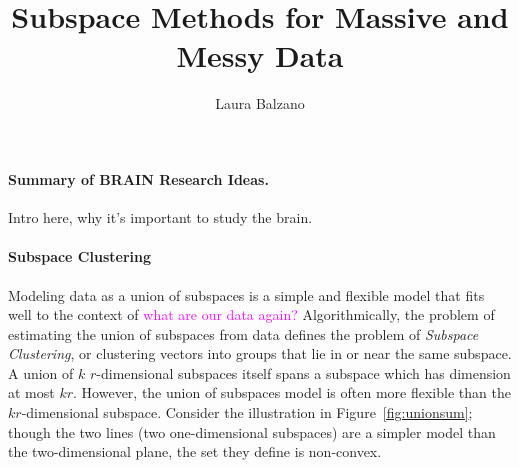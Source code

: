 \documentclass[times,11pt]{article} %
\newcommand{\laura}{\textcolor{magenta}}
\begin{document}
%
\title{Subspace Methods for Massive and Messy Data}

\author{Laura Balzano}
\def \E{\mathbb E}
\def \Expect{\mathbb E}
\def \1{\mathbf 1}
\def \P{\mathrm{Pr}}
\def \R{\mathbb{R}}
\def \S{\mathcal{S}}
\def \cA{\mathcal{A}}
\def \N{p}
\def \reals{\mathbb{R}}
\newcommand{\deq}{\mathrel{\stackrel{\scriptscriptstyle\Delta}{=}}}


\newenvironment{squishlist}
{   \begin{list}{$\bullet$}
    { \setlength{\itemsep}{2pt}      \setlength{\parsep}{2pt}
      \setlength{\topsep}{0pt}       \setlength{\partopsep}{0pt}
      \setlength{\leftmargin}{1.5em} \setlength{\labelwidth}{1em}
      \setlength{\labelsep}{0.5em} } }
      {\end{list}}
      
\newenvironment{squishlist2}
{   \begin{list}{$\blacktriangleright$}
    { \setlength{\itemsep}{2pt}      \setlength{\parsep}{2pt}
      \setlength{\topsep}{0pt}       \setlength{\partopsep}{0pt}
      \setlength{\leftmargin}{1.5em} \setlength{\labelwidth}{1em}
      \setlength{\labelsep}{0.5em} } }
      {\end{list}}




\renewcommand\thepage{C-1}

\paragraph{Summary of BRAIN Research Ideas.} Intro here, why it's important to study the brain.

\paragraph{Subspace Clustering}

Modeling data as a union of subspaces is a simple and flexible model that fits well to the context of \laura{what are our data again?}  Algorithmically, the problem of estimating the union of subspaces from data defines the problem of \emph{Subspace Clustering}, or clustering vectors into groups that lie in or near the same subspace. A union of $k$ $r$-dimensional subspaces itself spans a subspace which has dimension at most $kr$. However, the union of subspaces model is often more flexible than the $kr$-dimensional subspace. Consider the illustration in Figure~\ref{fig:unionsum}; though the two lines (two one-dimensional subspaces) are a simpler model than the two-dimensional plane, the set they define is non-convex.
\end{document}
